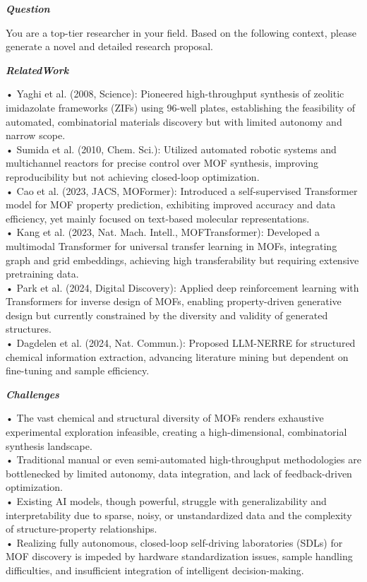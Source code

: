 \begin{tcolorbox}[
    breakable,
    title={Example of Idea Generation in Material},
    colback=LighterGray,
    colframe=DeepPurple,
    colbacktitle=DeepPurple,
    coltitle=White,
]
\textbf{\emph{\textcolor{DeepPurple}{Question}}}

You are a top-tier researcher in your field. Based on the following context, please generate a novel and detailed research proposal.

\textbf{\emph{\textcolor{CaseOrange}{RelatedWork}}}

• Yaghi et al. (2008, Science): Pioneered high-throughput synthesis of zeolitic imidazolate frameworks (ZIFs) using 96-well plates, establishing the feasibility of automated, combinatorial materials discovery but with limited autonomy and narrow scope. \\
• Sumida et al. (2010, Chem. Sci.): Utilized automated robotic systems and multichannel reactors for precise control over MOF synthesis, improving reproducibility but not achieving closed-loop optimization. \\
• Cao et al. (2023, JACS, MOFormer): Introduced a self-supervised Transformer model for MOF property prediction, exhibiting improved accuracy and data efficiency, yet mainly focused on text-based molecular representations. \\
• Kang et al. (2023, Nat. Mach. Intell., MOFTransformer): Developed a multimodal Transformer for universal transfer learning in MOFs, integrating graph and grid embeddings, achieving high transferability but requiring extensive pretraining data. \\
• Park et al. (2024, Digital Discovery): Applied deep reinforcement learning with Transformers for inverse design of MOFs, enabling property-driven generative design but currently constrained by the diversity and validity of generated structures. \\
• Dagdelen et al. (2024, Nat. Commun.): Proposed LLM-NERRE for structured chemical information extraction, advancing literature mining but dependent on fine-tuning and sample efficiency. 

\textbf{\emph{\textcolor{CaseOrange}{Challenges}}}

• The vast chemical and structural diversity of MOFs renders exhaustive experimental exploration infeasible, creating a high-dimensional, combinatorial synthesis landscape. \\
• Traditional manual or even semi-automated high-throughput methodologies are bottlenecked by limited autonomy, data integration, and lack of feedback-driven optimization. \\
• Existing AI models, though powerful, struggle with generalizability and interpretability due to sparse, noisy, or unstandardized data and the complexity of structure-property relationships. \\
• Realizing fully autonomous, closed-loop self-driving laboratories (SDLs) for MOF discovery is impeded by hardware standardization issues, sample handling difficulties, and insufficient integration of intelligent decision-making. 


\end{tcolorbox}
